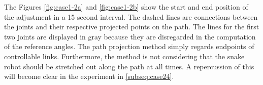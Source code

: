 The Figures \ref{fig:case1-2a} and \ref{fig:case1-2b} show the start and end position of the adjustment in a 15 second interval. The dashed lines are connections between the joints and their respective projected points on the path. The lines for the first two joints are displayed in gray because they are disregarded in the computation of the reference angles. The path projection method simply regards endpoints of controllable links. Furthermore, the method is not considering that the snake robot should be stretched out along the path at all times. A repercussion of this will become clear in the experiment in \ref{subseq:case24}.

\begin{figure}[H]
    \centering
    
    \hfil
    

\end{figure}
